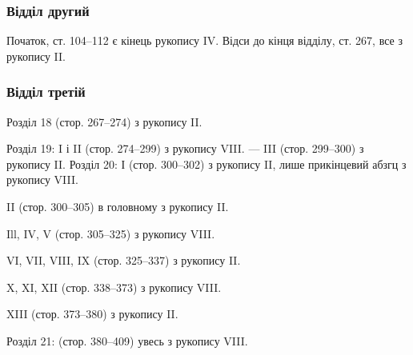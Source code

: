 \subsubsection*{Відділ другий}

Початок, ст. 104--112 є кінець рукопису IV. Відси до кінця відділу,
ст. 267, все з рукопису II.

\subsubsection*{Відділ третій}

Розділ 18 (стор. 267--274) з рукопису II.

Розділ 19: I і II (стор. 274--299) з рукопису VIII. — III (стор. 299--300)
з рукопису II.
Розділ 20: І (стор. 300--302) з рукопису II, лише прикінцевий
абзгц з рукопису VIII.

II (стор. 300--305) в головному з рукопису II.

Ill, IV, V (стор. 305--325) з рукопису VIII.

VI, VII, VIII, IX (стор. 325--337) з рукопису II.

X, XI, XII (стор. 338--373) з рукопису VIII.

XIII (стор. 373--380) з рукопису II.

Розділ 21: (стор. 380--409) увесь з рукопису VIII.
\parbreak{}  %
